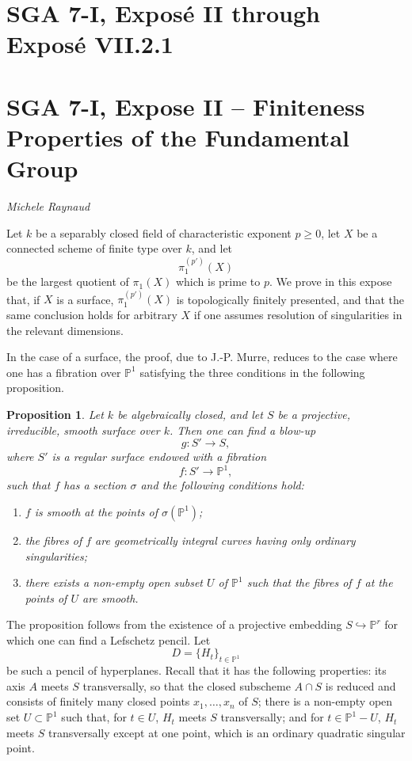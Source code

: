 \documentclass[11pt]{article}
\theoremstyle{plain}
\newtheorem{proposition}[theorem]{Proposition}
\theoremstyle{definition}
\theoremstyle{remark}
\begin{document}
\clearpage
\section*{SGA 7-I, Exposé II through Exposé VII.2.1}

\section*{SGA 7-I, Expose II -- Finiteness Properties of the Fundamental Group}

\begin{center}
\textit{Michele Raynaud}
\end{center}

Let $k$ be a separably closed field of characteristic exponent $p\ge 0$, let $X$ be a connected scheme of finite type over $k$, and let
\[
 \pi_1^{(p')}(X)
\]
be the largest quotient of $\pi_1(X)$ which is prime to $p$. We prove in this expose that, if $X$ is a surface, $\pi_1^{(p')}(X)$ is topologically finitely presented, and that the same conclusion holds for arbitrary $X$ if one assumes resolution of singularities in the relevant dimensions.

In the case of a surface, the proof, due to J.-P. Murre, reduces to the case where one has a fibration over $\mathbb P^1$ satisfying the three conditions in the following proposition.

\begin{proposition}
Let $k$ be algebraically closed, and let $S$ be a projective, irreducible, smooth surface over $k$. Then one can find a blow-up
\[
 g:S'\to S,
\]
where $S'$ is a regular surface endowed with a fibration
\[
 f:S'\to \mathbb P^1,
\]
such that $f$ has a section $\sigma$ and the following conditions hold:
\begin{enumerate}[label=\textup{(\roman*)}]
\item $f$ is smooth at the points of $\sigma(\mathbb P^1)$;
\item the fibres of $f$ are geometrically integral curves having only ordinary singularities;
\item there exists a non-empty open subset $U$ of $\mathbb P^1$ such that the fibres of $f$ at the points of $U$ are smooth.
\end{enumerate}
\end{proposition}

The proposition follows from the existence of a projective embedding $S\hookrightarrow \mathbb P^r$ for which one can find a Lefschetz pencil. Let
\[
D=\{H_t\}_{t\in \mathbb P^1}
\]
be such a pencil of hyperplanes. Recall that it has the following properties: its axis $A$ meets $S$ transversally, so that the closed subscheme $A\cap S$ is reduced and consists of finitely many closed points $x_1,\ldots,x_n$ of $S$; there is a non-empty open set $U\subset \mathbb P^1$ such that, for $t\in U$, $H_t$ meets $S$ transversally; and for $t\in \mathbb P^1-U$, $H_t$ meets $S$ transversally except at one point, which is an ordinary quadratic singular point.
\end{document}
